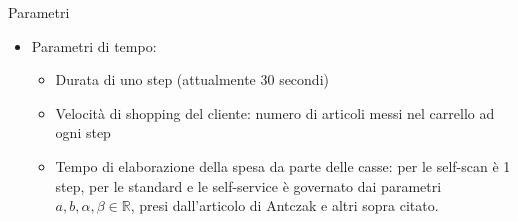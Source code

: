 \begin{frame}{Parametri}
	\begin{itemize}
		\item Parametri di tempo:
		\begin{itemize}
			\item Durata di uno step (attualmente 30 secondi)
			\item Velocità di shopping del cliente: numero di articoli messi nel carrello ad ogni step
			\item Tempo di elaborazione della spesa da parte delle casse: per le self-scan è 1 step, per le standard e le self-service è governato dai parametri $a, b, \alpha, \beta \in \mathbb{R}$, presi dall'articolo di Antczak e altri sopra citato.
		\end{itemize}
	\end{itemize}
\end{frame}